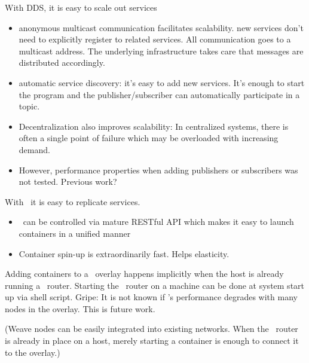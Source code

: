 With DDS, it is easy to scale out services
\begin{itemize}
\item anonymous multicast communication facilitates scalability. new services don't need to explicitly register to related services. All communication goes to a multicast address. The underlying infrastructure takes care that messages are distributed accordingly.
\item automatic service discovery: it's easy to add new services. It's enough to start the program and the publisher/subscriber can automatically participate in a topic.
\item Decentralization also improves scalability: In centralized systems, there is often a single point of failure which may be overloaded with increasing demand. 
\item However, performance properties when adding publishers or subscribers was not tested. Previous work?
\end{itemize}

With \docker\ it is easy to replicate services. 
\begin{itemize}
\item \docker\ can be controlled via mature RESTful API which makes it easy to launch containers in a unified manner
\item Container spin-up is extraordinarily fast. Helps elasticity.
\end{itemize}

Adding containers to a \weave\ overlay happens implicitly when the host is already running a \weave\ router. Starting the \weave\ router on a machine can be done at system start up via shell script. Gripe: It is not known if \weave 's performance degrades with many nodes in the overlay. This is future work.

(Weave nodes can be easily integrated into existing networks. When the \weave\ router is already in place on a host, merely starting a container is enough to connect it to the overlay.)

